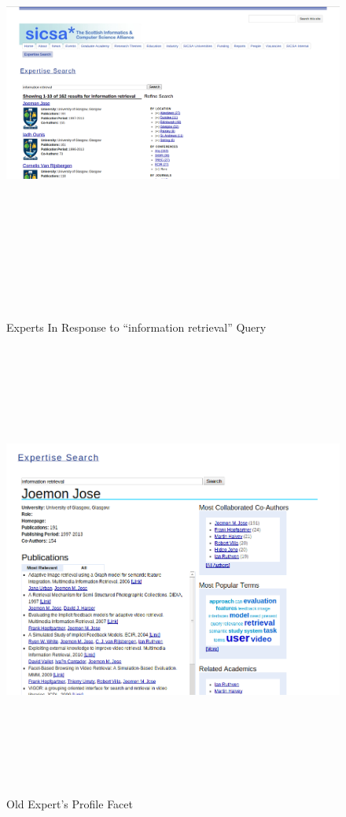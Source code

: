  \begin{figure}
 \centering
 \includegraphics[width=13cm,height=15cm,keepaspectratio]{./figures/oldsearch.png}
 \caption{Experts In Response to ``information retrieval'' Query} \label{fig:resultspage} 
 \end{figure}
 \begin{figure}
 \centering
 \includegraphics[width=13cm,height=15cm,keepaspectratio]{./figures/oldProfilePage.png}
 \caption{Old Expert's Profile Facet} \label{fig:profilepage} 
\end{figure}
